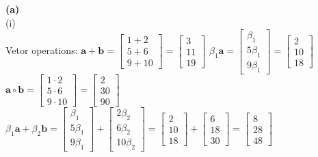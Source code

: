 \documentclass[11pt]{article}
\begin{document}
\textbf{(a)}\\
(i)\\
Vetor operations: $\mathbf{a}+\mathbf{b}= \begin{bmatrix} 1+2\\5+6\\9+10\end{bmatrix} =\begin{bmatrix} 3\\ 11\\ 19\end{bmatrix}$ \quad
$\beta_1 \mathbf{a} = \begin{bmatrix} \beta_1 \\ 5\beta_1 \\ 9\beta_1 \end{bmatrix} = \begin{bmatrix}2\\10\\18 \end{bmatrix}$\\
$\mathbf{a} \circ \mathbf{b}= \begin{bmatrix} 1 \cdot 2\\5 \cdot 6 \\ 9 \cdot 10\end{bmatrix}=\begin{bmatrix} 2\\ 30\\ 90\end{bmatrix}$ \quad
$\beta_1 \mathbf{a} + \beta_2 \mathbf{b} = \begin{bmatrix} \beta_1\\ 5\beta_1\\ 9\beta_1 \end{bmatrix} + 
\begin{bmatrix}2\beta_2\\ 6\beta_2\\ 10\beta_2 \end{bmatrix}=\begin{bmatrix}2\\10\\18\end{bmatrix}+\begin{bmatrix}6\\18\\30 \end{bmatrix}=\begin{bmatrix}8\\28\\48\end{bmatrix}$\\
\end{document}
